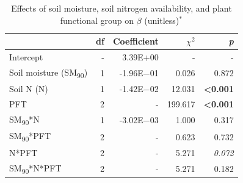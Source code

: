\newpage
\begin{table}
    \centering
    \caption[Effects of soil moisture, soil nitrogen availability, and plant functional group on $\beta$]{Effects of soil moisture, soil nitrogen availability, and plant functional group on $\beta$ (unitless)$^*$}
        \begin{tabular}{p{3.75cm}p{0.5cm}p{2cm}p{1.5cm}p{1.5cm}}
            \hline 
            & \multicolumn{1}{r}{df} 
            & \multicolumn{1}{r}{Coefficient} 
            & \multicolumn{1}{r}{$\chi^{2}$} 
            & \multicolumn{1}{r}{\textit{p}} 
            \\ 
            \hline
            
            Intercept
            & \multicolumn{1}{r}{-}
            & \multicolumn{1}{r}{3.39E+00}
            & \multicolumn{1}{r}{-}
            & \multicolumn{1}{r}{-}
            \\

            Soil moisture (SM\textsubscript{90})
            & \multicolumn{1}{r}{1}
            & \multicolumn{1}{r}{-1.96E$-$01}
            & \multicolumn{1}{r}{0.026}
            & \multicolumn{1}{r}{0.872}
            \\

            Soil N (N)
            & \multicolumn{1}{r}{1}
            & \multicolumn{1}{r}{-1.42E$-$02}
            & \multicolumn{1}{r}{12.031}
            & \multicolumn{1}{r}{\textbf{<0.001}}
            \\

            PFT
            & \multicolumn{1}{r}{2}
            & \multicolumn{1}{r}{-}
            & \multicolumn{1}{r}{199.617}
            & \multicolumn{1}{r}{\textbf{<0.001}}
            \\

            SM\textsubscript{90}*N
            & \multicolumn{1}{r}{1}
            & \multicolumn{1}{r}{-3.02E$-$03}
            & \multicolumn{1}{r}{1.000}
            & \multicolumn{1}{r}{0.317}
            \\

            SM\textsubscript{90}*PFT
            & \multicolumn{1}{r}{2}
            & \multicolumn{1}{r}{-}
            & \multicolumn{1}{r}{0.623}
            & \multicolumn{1}{r}{0.732}
            \\

            N*PFT
            & \multicolumn{1}{r}{2}
            & \multicolumn{1}{r}{-}
            & \multicolumn{1}{r}{5.271}
            & \multicolumn{1}{r}{\textit{0.072}}
            \\

            SM\textsubscript{90}*N*PFT
            & \multicolumn{1}{r}{2}
            & \multicolumn{1}{r}{-}
            & \multicolumn{1}{r}{5.271}
            & \multicolumn{1}{r}{0.182}
            \\
            \hline
        \end{tabular}%
    \label{tab:table4.2}
\end{table}
